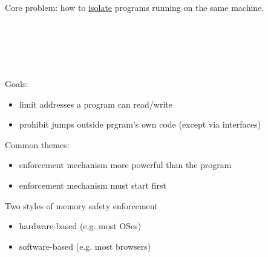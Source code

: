 Core problem: how to \underline{isolate} programs running on the same machine.

\\
\makebox[9cm]{\makebox[6.5cm]{}\makebox[2.5cm]{$\updownarrow$}}\\
\\
\makebox[9cm]{\makebox[6.5cm]{}\makebox[2.5cm]{$\updownarrow$}}\\

Goals:
\begin{itemize}
    \item limit addresses a program can read/write
    \item prohibit jumps outside prgram's own code (except via interfaces)
\end{itemize}
Common themes:
\begin{itemize}
    \item enforcement mechanism more powerful than the program
    \item enforcement mechanism must start first
\end{itemize}
Two styles of memory safety enforcement
\begin{itemize}
    \item hardware-based (e.g. most OSes)
    \item software-based (e.g. most browsers)
\end{itemize}
